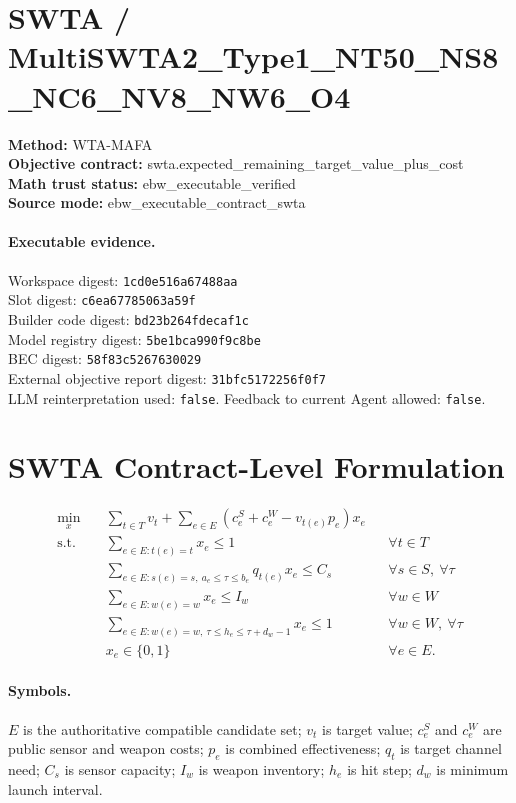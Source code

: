 \documentclass{article}
\begin{document}
\section*{SWTA / MultiSWTA2\_Type1\_NT50\_NS8\_NC6\_NV8\_NW6\_O4}
\textbf{Method:} WTA-MAFA\\
\textbf{Objective contract:} swta.expected\_remaining\_target\_value\_plus\_cost\\
\textbf{Math trust status:} ebw\_executable\_verified\\
\textbf{Source mode:} ebw\_executable\_contract\_swta

\paragraph{Executable evidence.}
Workspace digest: \texttt{1cd0e516a67488aa}\\
Slot digest: \texttt{c6ea67785063a59f}\\
Builder code digest: \texttt{bd23b264fdecaf1c}\\
Model registry digest: \texttt{5be1bca990f9c8be}\\
BEC digest: \texttt{58f83c5267630029}\\
External objective report digest: \texttt{31bfc5172256f0f7}\\
LLM reinterpretation used: \texttt{false}. Feedback to current Agent allowed: \texttt{false}.

\section*{SWTA Contract-Level Formulation}
\[
\begin{aligned}
\min_{x}\quad
& \sum_{t \in T} v_t + \sum_{e \in E} \left(c^S_e + c^W_e - v_{t(e)} p_e\right)x_e \\
\text{s.t.}\quad
& \sum_{e \in E: t(e)=t} x_e \le 1 && \forall t \in T \\
& \sum_{e \in E: s(e)=s,\ a_e \le \tau \le b_e} q_{t(e)} x_e \le C_s && \forall s \in S,\ \forall \tau \\
& \sum_{e \in E: w(e)=w} x_e \le I_w && \forall w \in W \\
& \sum_{e \in E: w(e)=w,\ \tau \le h_e \le \tau+d_w-1} x_e \le 1 && \forall w \in W,\ \forall \tau \\
& x_e \in \{0,1\} && \forall e \in E.
\end{aligned}
\]
\paragraph{Symbols.} $E$ is the authoritative compatible candidate set; $v_t$ is target value; $c^S_e$ and $c^W_e$ are public sensor and weapon costs; $p_e$ is combined effectiveness; $q_t$ is target channel need; $C_s$ is sensor capacity; $I_w$ is weapon inventory; $h_e$ is hit step; $d_w$ is minimum launch interval.
\end{document}
